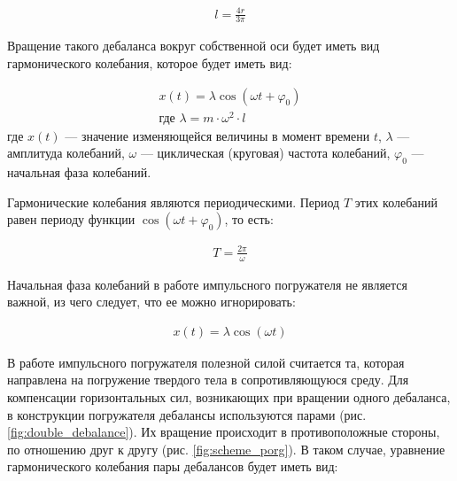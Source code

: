 \begin{equation}\label{eq:distance_mass}
    \begin{gathered}
        l = \frac{4 r}{3 \pi}
    \end{gathered}
\end{equation}

Вращение такого дебаланса вокруг собственной оси будет иметь вид гармонического колебания, которое будет иметь вид:

\begin{equation}\label{eq:harmonic}
    \begin{gathered}
        x(t) = \lambda \cos (\omega t + \varphi_0) \\
        \textrm{где } \lambda = m \cdot \omega^2 \cdot l
    \end{gathered}
\end{equation}
\noindent где $x(t)$  — значение изменяющейся величины в момент времени $t$, $\lambda$ — амплитуда колебаний,
$\omega$ — циклическая (круговая) частота колебаний, $\varphi_0$ — начальная фаза колебаний.

Гармонические колебания являются периодическими. Период $T$ этих колебаний равен периоду функции $\cos (\omega t + \varphi_0)$, то есть:

\begin{equation*}
    \begin{aligned}
        T = \frac{2 \pi}{\omega}
    \end{aligned}
\end{equation*}

Начальная фаза колебаний в работе импульсного погружателя не является важной, из чего следует, что ее можно игнорировать:

\begin{equation}\label{eq:harmonic_notphi}
    \begin{aligned}
        x(t) = \lambda \cos (\omega t)
    \end{aligned}
\end{equation}

В работе импульсного погружателя полезной силой считается та, которая направлена на погружение твердого тела в сопротивляющуюся среду.
Для компенсации горизонтальных сил, возникающих при вращении одного дебаланса,
в конструкции погружателя дебалансы используются парами (рис. \ref{fig:double_debalance}).
Их вращение происходит в противоположные стороны, по отношению друг к другу (рис. \ref{fig:scheme_porg}).
В таком случае, уравнение гармонического колебания пары дебалансов будет иметь вид:

